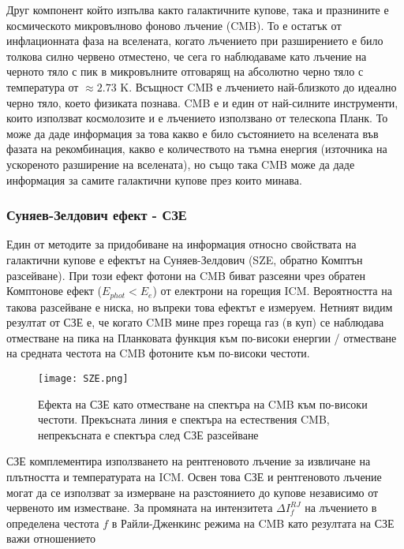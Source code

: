 \documentclass[a4paper,12pt]{article}
\begin{document}
Друг компонент който изпълва както галактичните купове, така и празнините е космическото микровълново фоново лъчение (CMB). То е остатък от инфлационната фаза на вселената, когато лъчението при разширението е било толкова силно червено отместено, че сега го наблюдаваме като лъчение на черното тяло с пик в микровълните отговарящ на абсолютно черно тяло с температура от $\approx 2.73$ K. Всъщност CMB е лъчението най-близкото до идеално черно тяло, което физиката познава. CMB е и един от най-силните инструменти, които използват космолозите и е лъчението използвано от телескопа Планк. То може да даде информация за това какво е било състоянието на вселената във фазата на рекомбинация, какво е количеството на тъмна енергия (източника на ускореното разширение на вселената), но също така CMB може да даде информация за самите галактични купове през които минава.\\

\subsubsection{Суняев-Зелдович ефект - СЗЕ}
\label{sec:SZE}
Един от методите за придобиване на информация относно свойствата на галактични купове е ефектът на Суняев-Зелдович (SZE, обратно Комптън разсейване). При този ефект фотони на CMB биват разсеяни чрез обратен Комптонове ефект ($E_{phot}<E_{e}$) от електрони на горещия ICM. Вероятността на такова разсейване е ниска, но въпреки това ефектът е измеруем. Нетният видим резултат от СЗЕ е, че когато CMB мине през гореща газ (в куп) се наблюдава отместване на пика на Планковата функция към по-високи енергии / отместване на средната честота на CMB фотоните към по-високи честоти.


\begin{figure}[h!] %
\centering
\texttt{[image: SZE.png]}
\caption{Ефекта на СЗЕ като отместване на спектъра на CMB към по-високи честоти. Прекъсната линия е спектъра на естествения CMB, непрекъсната е спектъра след СЗЕ разсейване}
\label{fig:SZE}
\end{figure}


СЗЕ комплементира използването на рентгеновото лъчение за извличане на плътността и температурата на ICM. Освен това СЗЕ и рентгеновото лъчение могат да се използват за измерване на разстоянието до купове независимо от червеното им изместване. За промяната на интензитета $\Delta I_f^{RJ}$ на лъчението в определена честота $f$ в Райли-Дженкинс режима на CMB като резултата на СЗЕ важи отношението 
\end{document}
